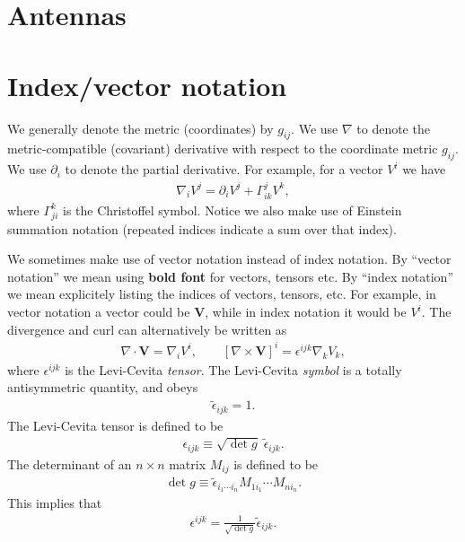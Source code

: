 \documentclass[12pt]{report}
\newcommand{\bV}{{\bm V}}
\begin{document}
\chapter{Antennas}

\appendix
\chapter{Index/vector notation}

We generally denote the metric (coordinates) by $g_{ij}$.
We use $\nabla$ to denote the metric-compatible (covariant) derivative with respect to the coordinate metric $g_{ij}$.
We use $\partial_i$ to denote the partial derivative.
For example, for a vector $V^i$ we have
\begin{align}
    \nabla_iV^j
    =
    \partial_iV^j
    +
    \Gamma^j_{ik}V^k
    ,
\end{align}
where $\Gamma^k_{ji}$ is the Christoffel symbol.
Notice we also make use of Einstein summation notation (repeated indices indicate a sum over that index).

We sometimes make use of vector notation instead of index notation.
By ``vector notation'' we mean using \textbf{bold font} for vectors, tensors etc.
By ``index notation'' we mean explicitely listing the indices of vectors, tensors, etc.
For example, in vector notation a vector could be $\bV$, while in index notation it would be $V^i$.
The divergence and curl can alternatively be written as
\begin{align}
    \nabla\cdot\bV
    =
    \nabla_iV^i
    ,\qquad
    \left[\nabla\times \bV\right]^i
    =
    \epsilon^{ijk}\nabla_kV_k
    ,
\end{align}
where $\epsilon^{ijk}$ is the Levi-Cevita \emph{tensor}.
The Levi-Cevita \emph{symbol} is a totally antisymmetric quantity, and obeys
\begin{align}
    \tilde{\epsilon}_{ijk} = 1
    .
\end{align}
The Levi-Cevita tensor is defined to be
\begin{align}
    \epsilon_{ijk} \equiv \sqrt{\det g} \; \tilde{\epsilon}_{ijk}
    .
\end{align}
The determinant of an $n\times n$ matrix $M_{ij}$ is defined to be
\begin{align}
    \det g
    \equiv
    \tilde{\epsilon}_{i_1\cdots i_n}M_{1i_1}\cdots M_{ni_n}
    .
\end{align}
This implies that
\begin{align}
    \epsilon^{ijk}
    =
    \frac{1}{\sqrt{\det g}} \tilde{\epsilon}_{ijk}
    .
\end{align}
\end{document}
